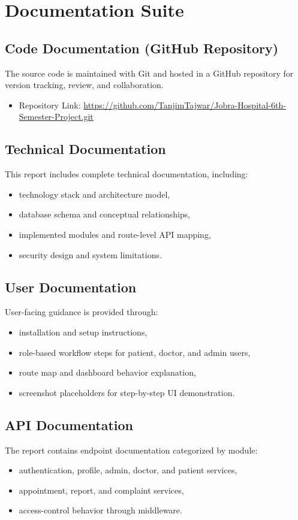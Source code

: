 \documentclass[12pt,a4paper]{article}
\begin{document}
\section{Documentation Suite}
\subsection{Code Documentation (GitHub Repository)}
The source code is maintained with Git and hosted in a GitHub repository for version tracking, review, and collaboration.
\begin{itemize}[leftmargin=1.2cm]
    \item Repository Link: \url{https://github.com/TanjimTajwar/Jobra-Hospital-6th-Semester-Project.git}
\end{itemize}

\subsection{Technical Documentation}
This report includes complete technical documentation, including:
\begin{itemize}[leftmargin=1.2cm]
    \item technology stack and architecture model,
    \item database schema and conceptual relationships,
    \item implemented modules and route-level API mapping,
    \item security design and system limitations.
\end{itemize}

\subsection{User Documentation}
User-facing guidance is provided through:
\begin{itemize}[leftmargin=1.2cm]
    \item installation and setup instructions,
    \item role-based workflow steps for patient, doctor, and admin users,
    \item route map and dashboard behavior explanation,
    \item screenshot placeholders for step-by-step UI demonstration.
\end{itemize}

\subsection{API Documentation}
The report contains endpoint documentation categorized by module:
\begin{itemize}[leftmargin=1.2cm]
    \item authentication, profile, admin, doctor, and patient services,
    \item appointment, report, and complaint services,
    \item access-control behavior through middleware.
\end{itemize}
\end{document}
